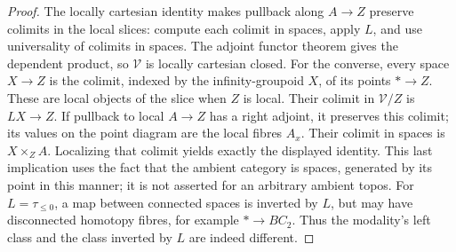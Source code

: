 \begin{proof}
The locally cartesian identity makes pullback along $A\to Z$ preserve colimits in the local slices: compute each colimit in spaces, apply $L$, and use universality of colimits in spaces. The adjoint functor theorem gives the dependent product, so $\mathcal V$ is locally cartesian closed. For the converse, every space $X\to Z$ is the colimit, indexed by the infinity-groupoid $X$, of its points $*\to Z$. These are local objects of the slice when $Z$ is local. Their colimit in $\mathcal V/Z$ is $LX\to Z$. If pullback to local $A\to Z$ has a right adjoint, it preserves this colimit; its values on the point diagram are the local fibres $A_x$. Their colimit in spaces is $X\times_ZA$. Localizing that colimit yields exactly the displayed identity. This last implication uses the fact that the ambient category is spaces, generated by its point in this manner; it is not asserted for an arbitrary ambient topos. For $L=\tau_{\leq0}$, a map between connected spaces is inverted by $L$, but may have disconnected homotopy fibres, for example $*\to BC_2$. Thus the modality's left class and the class inverted by $L$ are indeed different.
\end{proof}
